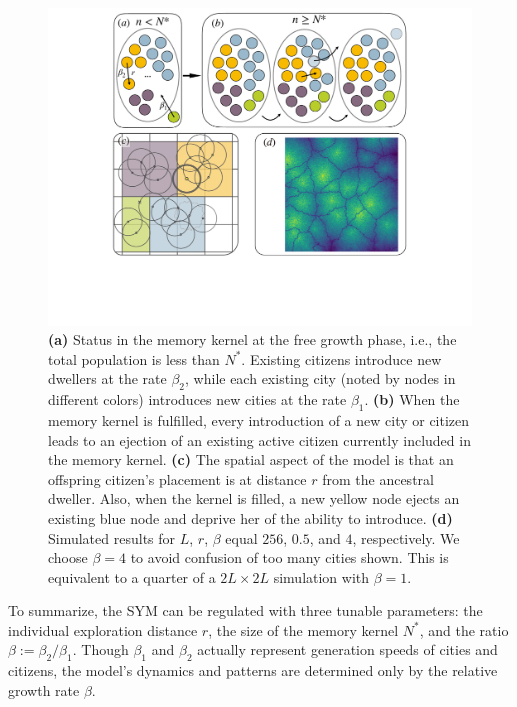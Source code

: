 \begin{figure}
	\centering
	\includegraphics[width = 0.95\linewidth]{Pics/symsketch.pdf}
	\caption{\textbf{(a)} Status in the memory kernel at the free growth phase, i.e., the total population is less than $N^*$. Existing citizens introduce new dwellers at the rate $\beta_2$, while each existing city (noted by nodes in different colors) introduces new cities at the rate $\beta_1$. \textbf{(b)} When the memory kernel is fulfilled, every introduction of a new city or citizen leads to an ejection of an existing active citizen currently included in the memory kernel. \textbf{(c)} The spatial aspect of the model is that an offspring citizen's placement is at distance $r$ from the ancestral dweller. Also, when the kernel is filled, a new yellow node ejects an existing blue node and deprive her of the ability to introduce. \textbf{(d)} Simulated results for $L$, $r$, $\beta$ equal $256$, $0.5$, and $4$, respectively. We choose $\beta = 4$ to avoid confusion of too many cities shown. This is equivalent to a quarter of a $2L\times 2L$ simulation with $\beta = 1$.}
	\label{sketchpic}
\end{figure}

To summarize, the SYM can be regulated with three tunable parameters: the individual exploration distance $r$, the size of the memory kernel $N^*$, and the ratio $\beta:=\beta_2/\beta_1$. Though $\beta_1$ and $\beta_2$ actually represent generation speeds of cities and citizens, the model's dynamics and patterns are determined only by the relative growth rate $\beta$.

